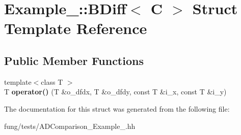 \hypertarget{structExample__3_1_1BDiff}{\section{Example\-\_\-:\-:B\-Diff$<$ C $>$ Struct Template Reference}
\label{structExample__3_1_1BDiff}
}
\subsection*{Public Member Functions}
\begin{DoxyCompactItemize}
\item 
\hypertarget{structExample__3_1_1BDiff_a646a89c49ab67baf4e49a3bcc9996776}{{\footnotesize template$<$class T $>$ }\\T {\bfseries operator()} (T \&o\-\_\-dfdx, T \&o\-\_\-dfdy, const T \&i\-\_\-x, const T \&i\-\_\-y)}\label{structExample__3_1_1BDiff_a646a89c49ab67baf4e49a3bcc9996776}

\end{DoxyCompactItemize}


The documentation for this struct was generated from the following file\-:\begin{DoxyCompactItemize}
\item 
fung/tests/A\-D\-Comparison\-\_\-\-Example\-\_.\-hh\end{DoxyCompactItemize}
